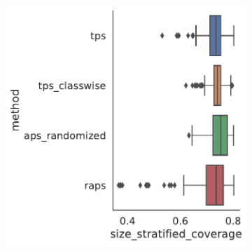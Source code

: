 \begin{figure}
\begin{subfigure}{0.48\linewidth}
        \includegraphics[width=\linewidth,alt={Box plots for method comparison on CiteSeer dataset size stratified coverage.}]{graphConformal/figures/split/citeseer_size_stratified_coverage} 
     \end{subfigure}


\end{figure}

